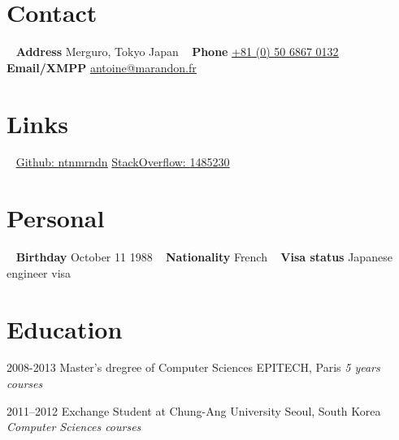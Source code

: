 \documentclass[]{template/friggeri-cv} %
\begin{document}


\begin{aside} %
\section{Contact}
~
\textbf{Address}
Merguro, Tokyo
Japan
~
\textbf{Phone}
\href{tel:00815068670132}{\underline{+81 (0) 50 6867 0132}}
~
\textbf{Email/XMPP}
\href{mailto:antoine@marandon.fr}{\underline{antoine@marandon.fr}}
\section {Links}
~
\href{https://github.com/ntnmrndn}{Github: \underline{ntnmrndn}}
\href{http://stackoverflow.com/users/1485230/}{StackOverflow: \underline{1485230}}
\section{Personal}
~
\textbf{Birthday}
October 11 1988
~
\textbf{Nationality}
French
~
\textbf{Visa status}
Japanese engineer visa
\end{aside}


\section{Education}

\begin{entrylist}


\entry
{2008-2013}
{Master's dregree {\normalfont of Computer Sciences}}
{EPITECH, Paris}
{\emph{5 years courses}}


\entry
{2011--2012}
{Exchange Student {\normalfont at Chung-Ang University}}
{Seoul, South Korea}
{\emph{Computer Sciences courses}}


\end{entrylist}
\end{document}
